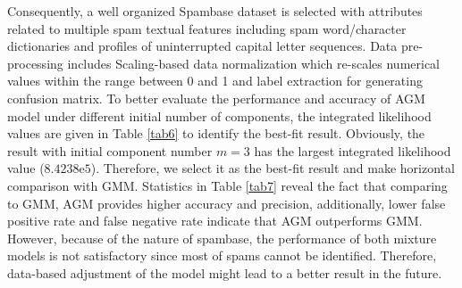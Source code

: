 Consequently, a well organized Spambase dataset \cite{Hopkins2018} is selected with attributes related to multiple spam textual features including spam word/character dictionaries and profiles of uninterrupted capital letter sequences. Data pre-processing includes Scaling-based data normalization which re-scales numerical values within the range between 0 and 1 and label extraction for generating confusion matrix. To better evaluate the performance and accuracy of AGM model under different initial number of components, the integrated likelihood \cite{Bouguila2009} values are given in Table \ref{tab6} to identify the best-fit result. Obviously, the result with initial component number $m=3$ has the largest integrated likelihood value ($8.4238\mathrm{e}{5}$). Therefore, we select it as the best-fit result and make horizontal comparison with GMM. Statistics in Table \ref{tab7} reveal the fact that comparing to GMM, AGM provides higher accuracy and precision, additionally, lower false positive rate and false negative rate indicate that AGM outperforms GMM. However, because of the nature of spambase, the performance of both mixture models is not satisfactory since most of spams cannot be identified. Therefore, data-based adjustment of the model might lead to a better result in the future. 

